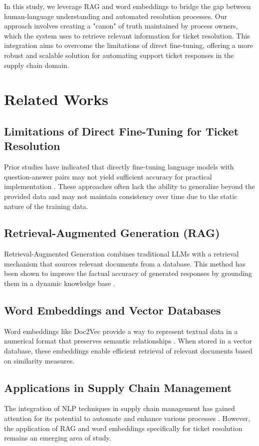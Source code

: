 \documentclass[11pt]{article}
\begin{document}
In this study, we leverage RAG and word embeddings to bridge the gap between human-language understanding and automated resolution processes. Our approach involves creating a "canon" of truth maintained by process owners, which the system uses to retrieve relevant information for ticket resolution. This integration aims to overcome the limitations of direct fine-tuning, offering a more robust and scalable solution for automating support ticket responses in the supply chain domain.

\section{Related Works}
\subsection{Limitations of Direct Fine-Tuning for Ticket Resolution}
Prior studies have indicated that directly fine-tuning language models with question-answer pairs may not yield sufficient accuracy for practical implementation \cite{smith2019automating, patel2020assessing}. These approaches often lack the ability to generalize beyond the provided data and may not maintain consistency over time due to the static nature of the training data.

\subsection{Retrieval-Augmented Generation (RAG)}
Retrieval-Augmented Generation combines traditional LLMs with a retrieval mechanism that sources relevant documents from a database. This method has been shown to improve the factual accuracy of generated responses by grounding them in a dynamic knowledge base \cite{zhang2020enhancing}.

\subsection{Word Embeddings and Vector Databases}
Word embeddings like Doc2Vec provide a way to represent textual data in a numerical format that preserves semantic relationships \cite{wang2017doc2vec, li2019leveraging}. When stored in a vector database, these embeddings enable efficient retrieval of relevant documents based on similarity measures.

\subsection{Applications in Supply Chain Management}
The integration of NLP techniques in supply chain management has gained attention for its potential to automate and enhance various processes \cite{smith2018domain}. However, the application of RAG and word embeddings specifically for ticket resolution remains an emerging area of study.
\end{document}
